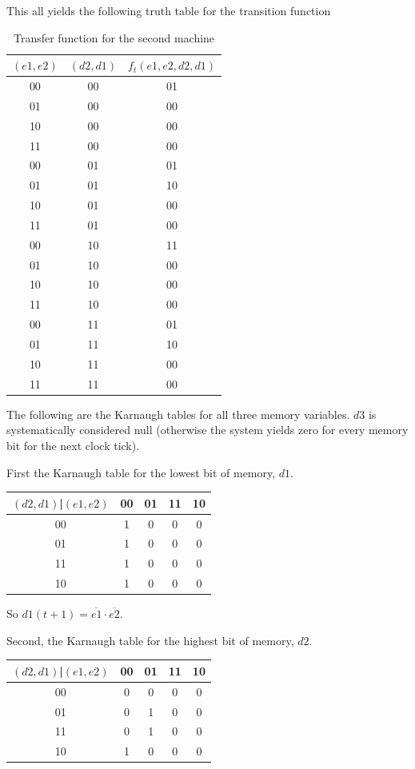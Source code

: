 \documentclass[a4paper,10pt]{article}
\begin{document}
This all yields the following truth table for the transition function
\begin{table}[ht!]
	\centering
	\begin{tabular}{|c|c|c|}
		\hline
		$(e1,e2)$&$(d2,d1)$&$f_t(e1,e2,d2,d1)$\\\hline
		00&00&01\\\hline
		01&00&00\\\hline
		10&00&00\\\hline
		11&00&00\\\hline
		00&01&01\\\hline
		01&01&10\\\hline
		10&01&00\\\hline
		11&01&00\\\hline
		00&10&11\\\hline
		01&10&00\\\hline
		10&10&00\\\hline
		11&10&00\\\hline
		00&11&01\\\hline
		01&11&10\\\hline
		10&11&00\\\hline
		11&11&00\\\hline
	\end{tabular}
	\caption{Transfer function for the second machine}
\end{table}

The following are the Karnaugh tables for all three memory variables. $d3$ is systematically considered null (otherwise the system yields zero for every memory bit for the next clock tick).

First the Karnaugh table for the lowest bit of memory, $d1$.
\begin{table}
	\centering
	\begin{tabular}{|c|c|c|c|c|}
		\hline
		$(d2,d1)$|$(e1,e2)$&00&01&11&10\\\hline
		00&1&0&0&0\\\hline
		01&1&0&0&0\\\hline
		11&1&0&0&0\\\hline
		10&1&0&0&0\\\hline
	\end{tabular}
\end{table}

So $d1(t+1)=\overline{e1}\cdot\overline{e2}$.

Second, the Karnaugh table for the highest bit of memory, $d2$.

\begin{table}
	\centering
	\begin{tabular}{|c|c|c|c|c|}
		\hline
		$(d2,d1)$|$(e1,e2)$&00&01&11&10\\\hline
		00&0&0&0&0\\\hline
		01&0&1&0&0\\\hline
		11&0&1&0&0\\\hline
		10&1&0&0&0\\\hline
	\end{tabular}
\end{table}
\end{document}
